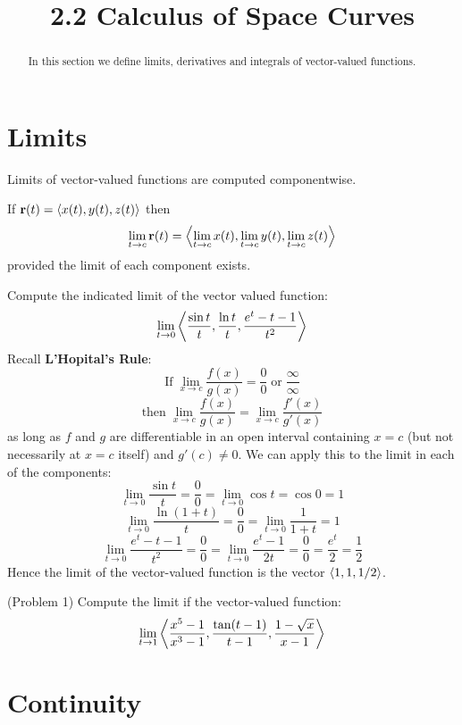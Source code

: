 \documentclass[handout]{ximera}
\title{2.2 Calculus of Space Curves}
\begin{document}
\begin{abstract}
In this section we define limits, derivatives and integrals of vector-valued functions.
\end{abstract}

\maketitle

\section{Limits}
Limits of vector-valued functions are computed componentwise. 
\begin{definition}
If $\mathbf r(t) = \left\langle x(t), y(t), z(t)\right\rangle$ then
\[
\lim_{t \to c} \mathbf r(t) = \left\langle \lim_{t \to c}x(t), \lim_{t \to c}y(t),\lim_{t \to c} z(t)\right\rangle
\]
provided the limit of each component exists.
\end{definition}

\begin{example}[Example 1]
Compute the indicated limit of the vector valued function:
\[
\lim_{t \to 0} \left\langle \frac{\sin t}{t}, \frac{\ln t}{t}, \frac{e^t - t -1}{t^2}\right\rangle
\]
Recall \textbf{L'Hopital's Rule}:
\[
\text{If}\; \lim_{x \to c} \frac{f(x)}{g(x)} = \frac00 \; \text{or} \; \frac{\infty}{\infty} 
\]
\[
\text{then} \; \lim_{x \to c} \frac{f(x)}{g(x)} = \lim_{x \to c} \frac{f'(x)}{g'(x)}
\]
as long as $f$ and $g$ are differentiable in an open interval containing $x = c$ (but not necessarily at $x = c$ itself)
and $g'(c) \neq 0$. We can apply this to the limit in each of the components:
\[
\lim_{t \to 0} \frac{\sin t}{t} = \frac00 = \lim_{t\to 0} \cos t = \cos 0  = 1
\]
\[
\lim_{t \to 0} \frac{\ln(1+t)}{t} = \frac00 = \lim_{t\to 0} \frac{1}{1+t} = 1
\]
\[
\lim_{t \to 0} \frac{e^t - t - 1}{t^2} = \frac00 = \lim_{t\to 0} \frac{e^t - 1}{2t} = \frac00 = \frac{e^t}{2}  = \frac12
\]
Hence the limit of the vector-valued function is the vector $\left\langle 1, 1, 1/2\right\rangle$.
\end{example}

\begin{problem}(Problem 1)
Compute the limit if the vector-valued function:
\[
\lim_{t \to 1} \left\langle \frac{x^5 - 1}{x^3 - 1}, \frac{\tan(t-1)}{t-1}, \frac{1 - \sqrt x}{x-1}\right\rangle
\]
\end{problem}

\section{Continuity}
\end{document}
